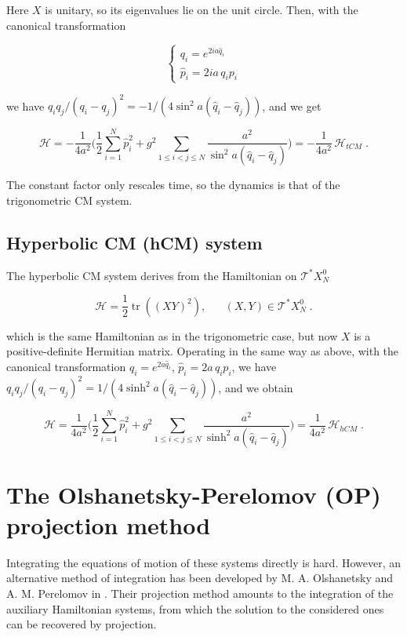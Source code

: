 Here $X$ is unitary, so its eigenvalues lie on the unit circle. Then, with the canonical transformation

\begin{equation}
    \begin{cases}
    q_i = e^{2ia\hat q_i} \\
    \hat p_i = 2ia\, q_ip_i
    \end{cases}
\end{equation}

we have $q_i q_j/(q_i - q_j)^2 = -1/(4\sin^2{a(\hat q_i - \hat q_j)})$, and we get

\begin{equation}
\mathcal{H} = -\frac{1}{4a^2}\Big(\frac{1}{2} \sum_{i=1}^N \hat p_i^2 + g^2 \sum_{1 \leq i < j \leq N} \frac{a^2}{\sin^2{a(\hat q_i - \hat q_j)}}\Big) = -\frac{1}{4a^2}\,\mathcal{H}_{tCM}\;.
\end{equation}

The constant factor only rescales time, so the dynamics is that of the trigonometric CM system.

\subsection{Hyperbolic CM (hCM) system}
The hyperbolic CM system derives from the Hamiltonian on $\mathcal{T}^\ast X^0_N$

\begin{equation}
    \mathcal{H} = \frac{1}{2}\operatorname{tr}((XY)^2), \;\;\;\;\;\;(X,Y) \in \mathcal{T}^\ast X^0_N\;.
\end{equation}

which is the same Hamiltonian as in the trigonometric case, but now $X$ is a positive-definite Hermitian matrix. Operating in the same way as above, with the canonical transformation $q_i = e^{2a\hat q_i}$, $\hat p_i = 2a\, q_ip_i$, we have $q_i q_j/(q_i - q_j)^2 = 1/(4\sinh^2{a(\hat q_i - \hat q_j)})$, and we obtain

\begin{equation}
    \mathcal{H} = \frac{1}{4a^2}\Big(\frac{1}{2} \sum_{i=1}^N \hat p_i^2 + g^2 \sum_{1 \leq i < j \leq N} \frac{a^2}{\sinh^2{a(\hat q_i - \hat q_j)}}\Big) = \frac{1}{4a^2}\,\mathcal{H}_{hCM}\;.
\end{equation}

\section{The Olshanetsky-Perelomov (OP) projection method}
Integrating the equations of motion of these systems directly is hard. However, an alternative method of integration has been developed by M. A. Olshanetsky and A. M. Perelomov in \cite{olshanetskyperelomov}. Their projection method amounts to the integration of the auxiliary Hamiltonian systems, from which the solution to the considered ones can be recovered by projection.

